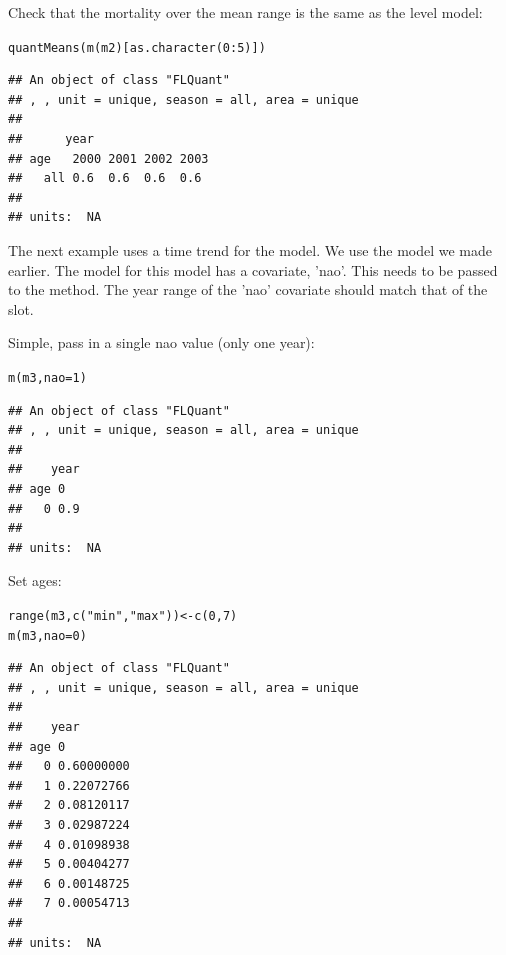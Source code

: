 \documentclass[a4paper,english,10pt]{article}\usepackage[]{graphicx}\usepackage[]{color}
\makeatletter
\newcommand{\hlnum}[1]{\textcolor[rgb]{0.063,0.58,0.627}{#1}}%
\newcommand{\hlstr}[1]{\textcolor[rgb]{0.063,0.58,0.627}{#1}}%
\newcommand{\hlopt}[1]{\textcolor[rgb]{0.196,0.196,0.196}{#1}}%
\newcommand{\hlstd}[1]{\textcolor[rgb]{0.196,0.196,0.196}{#1}}%
\newcommand{\hlkwb}[1]{\textcolor[rgb]{0.627,0,0.314}{#1}}%
\newcommand{\hlkwc}[1]{\textcolor[rgb]{0,0.631,0.314}{#1}}%
\newcommand{\hlkwd}[1]{\textcolor[rgb]{0.78,0.227,0.412}{#1}}%
\newenvironment{kframe}{%
 \def\at@end@of@kframe{}%
 \ifinner\ifhmode%
  \def\at@end@of@kframe{\end{minipage}}%
  \begin{minipage}{\columnwidth}%
 \fi\fi%
 \def\FrameCommand##1{\hskip\@totalleftmargin \hskip-\fboxsep
 \colorbox{shadecolor}{##1}\hskip-\fboxsep
     \hskip-\linewidth \hskip-\@totalleftmargin \hskip\columnwidth}%
 \MakeFramed {\advance\hsize-\width
   \@totalleftmargin\z@ \linewidth\hsize
   \@setminipage}}%
 {\par\unskip\endMakeFramed%
 \at@end@of@kframe}
\newenvironment{knitrout}{}{} %
\makeatother
\begin{document}
Check that the mortality over the mean range is the same as the level model:

\begin{knitrout}
\color{fgcolor}\begin{kframe}
\begin{alltt}
\hlkwd{quantMeans}\hlstd{(}\hlkwd{m}\hlstd{(m2)[}\hlkwd{as.character}\hlstd{(}\hlnum{0}\hlopt{:}\hlnum{5}\hlstd{)])}
\end{alltt}
\begin{verbatim}
## An object of class "FLQuant"
## , , unit = unique, season = all, area = unique
## 
##      year
## age   2000 2001 2002 2003
##   all 0.6  0.6  0.6  0.6 
## 
## units:  NA
\end{verbatim}
\end{kframe}
\end{knitrout}

The next example uses a time trend for the  model. We use the  model we made earlier. The  model for this model has a covariate, 'nao'. This needs to be passed to the  method. The year range of the 'nao' covariate should match that of the  slot.

Simple, pass in a single nao value (only one year):

\begin{knitrout}
\color{fgcolor}\begin{kframe}
\begin{alltt}
\hlkwd{m}\hlstd{(m3,} \hlkwc{nao} \hlstd{=} \hlnum{1}\hlstd{)}
\end{alltt}
\begin{verbatim}
## An object of class "FLQuant"
## , , unit = unique, season = all, area = unique
## 
##    year
## age 0  
##   0 0.9
## 
## units:  NA
\end{verbatim}
\end{kframe}
\end{knitrout}

Set ages:

\begin{knitrout}
\color{fgcolor}\begin{kframe}
\begin{alltt}
\hlkwd{range}\hlstd{(m3,} \hlkwd{c}\hlstd{(}\hlstr{"min"}\hlstd{,} \hlstr{"max"}\hlstd{))} \hlkwb{<-} \hlkwd{c}\hlstd{(}\hlnum{0}\hlstd{,} \hlnum{7}\hlstd{)}
\hlkwd{m}\hlstd{(m3,} \hlkwc{nao} \hlstd{=} \hlnum{0}\hlstd{)}
\end{alltt}
\begin{verbatim}
## An object of class "FLQuant"
## , , unit = unique, season = all, area = unique
## 
##    year
## age 0         
##   0 0.60000000
##   1 0.22072766
##   2 0.08120117
##   3 0.02987224
##   4 0.01098938
##   5 0.00404277
##   6 0.00148725
##   7 0.00054713
## 
## units:  NA
\end{verbatim}
\end{kframe}
\end{knitrout}
\end{document}
